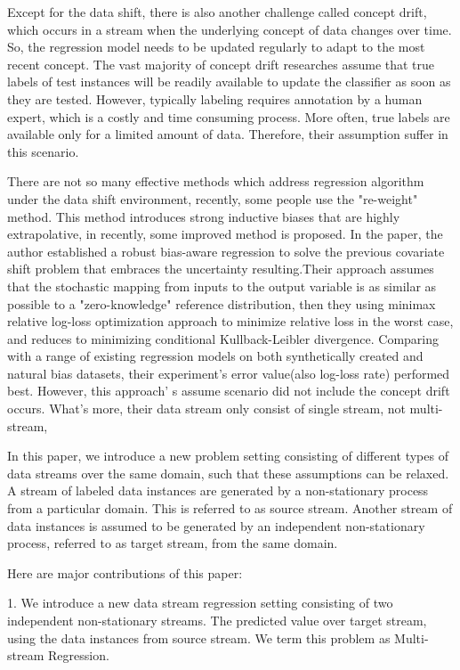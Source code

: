 Except for the data shift, there is also another challenge 
called concept drift\cite{Parker}, which  occurs  in  a  stream  when  the  underlying concept of data changes over time. So, the  regression model needs  to  be  updated  regularly to adapt  to  the  most  recent concept. The  vast  majority  of  concept  drift  researches assume  that  true  labels  of  test instances  will  be  readily  available  to  update  the  classifier  as 
soon  as  they  are  tested.  However,  typically  labeling  
requires annotation  by  a  human  expert,  which  is  a  costly  and  time consuming process. More often, true labels are available only for a limited amount of data. Therefore, their  assumption suffer in this scenario.


  
  There are not so many effective methods which address regression algorithm under the data shift environment, recently, some people use the "re-weight" method. This method introduces strong inductive biases that are highly extrapolative, in recently, some improved method is proposed. In the paper\cite{chen}, the author established a robust bias-aware regression to solve the previous covariate shift problem that embraces the uncertainty resulting.Their approach assumes that the stochastic mapping from inputs to the output variable is as similar as possible to a "zero-knowledge" reference distribution, then they using minimax relative log-loss optimization approach to minimize relative loss in the worst case, and reduces to minimizing conditional Kullback-Leibler divergence. Comparing with a range of existing regression models on both synthetically created and natural bias datasets, their experiment's error value(also log-loss rate) performed best. However, this approach' s assume scenario did not include the concept drift occurs. What's more, their data stream only consist of single stream, not multi-stream,
  
  In  this  paper,  we  introduce  a  new  problem  setting  consisting of different types of data streams over the same domain, such that these assumptions can be relaxed.  A stream of labeled data instances are generated by a non-stationary process from a particular domain.  This is referred to as source stream.   Another  stream  of  data  instances  is  assumed  to be generated by an independent non-stationary process, referred to as target stream, from the same domain.
  
  
  Here are major contributions of this paper:
  
  1. We introduce a new data stream regression setting consisting of two independent non-stationary streams. The predicted value over target stream, using the data instances from source stream. We term this problem as Multi-stream Regression. 
  
